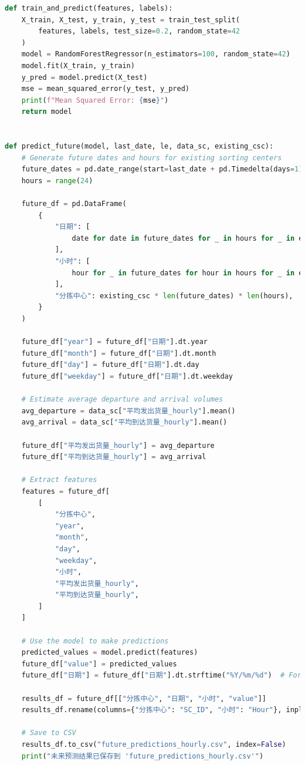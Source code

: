 \documentclass[UTF8,a4paper,10 pt]{article}%
\begin{document}
\begin{lstlisting}[language=python]
def train_and_predict(features, labels):
    X_train, X_test, y_train, y_test = train_test_split(
        features, labels, test_size=0.2, random_state=42
    )
    model = RandomForestRegressor(n_estimators=100, random_state=42)
    model.fit(X_train, y_train)
    y_pred = model.predict(X_test)
    mse = mean_squared_error(y_test, y_pred)
    print(f"Mean Squared Error: {mse}")
    return model


def predict_future(model, last_date, le, data_sc, existing_csc):
    # Generate future dates and hours for existing sorting centers
    future_dates = pd.date_range(start=last_date + pd.Timedelta(days=1), periods=30)
    hours = range(24)

    future_df = pd.DataFrame(
        {
            "日期": [
                date for date in future_dates for _ in hours for _ in existing_csc
            ],
            "小时": [
                hour for _ in future_dates for hour in hours for _ in existing_csc
            ],
            "分拣中心": existing_csc * len(future_dates) * len(hours),
        }
    )

    future_df["year"] = future_df["日期"].dt.year
    future_df["month"] = future_df["日期"].dt.month
    future_df["day"] = future_df["日期"].dt.day
    future_df["weekday"] = future_df["日期"].dt.weekday

    # Estimate average departure and arrival volumes
    avg_departure = data_sc["平均发出货量_hourly"].mean()
    avg_arrival = data_sc["平均到达货量_hourly"].mean()

    future_df["平均发出货量_hourly"] = avg_departure
    future_df["平均到达货量_hourly"] = avg_arrival

    # Extract features
    features = future_df[
        [
            "分拣中心",
            "year",
            "month",
            "day",
            "weekday",
            "小时",
            "平均发出货量_hourly",
            "平均到达货量_hourly",
        ]
    ]

    # Use the model to make predictions
    predicted_values = model.predict(features)
    future_df["value"] = predicted_values
    future_df["日期"] = future_df["日期"].dt.strftime("%Y/%m/%d")  # Format the date

    results_df = future_df[["分拣中心", "日期", "小时", "value"]]
    results_df.rename(columns={"分拣中心": "SC_ID", "小时": "Hour"}, inplace=True)

    # Save to CSV
    results_df.to_csv("future_predictions_hourly.csv", index=False)
    print("未来预测结果已保存到 'future_predictions_hourly.csv'")



\end{lstlisting}
\end{document}
